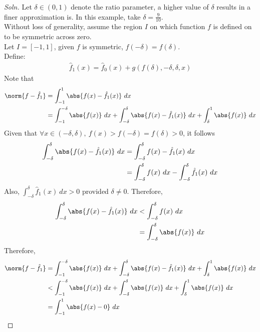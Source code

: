 \documentclass{article}
\begin{document}
	\subsubsection{}
	\begin{proof}[Soln]
		Let $\delta \in (0, 1)$ denote the ratio parameter, a higher value of $\delta$ results in a finer approximation is. In this example, take $\delta = \frac{9}{10}$. \\
		Without loss of generality, assume the region $I$ on which function $f$ is defined on to be symmetric across zero. \\
		Let $I = [-1, 1]$, given $f$ is symmetric, $f(-\delta) = f(\delta)$. \\
		Define:
		\begin{align}
			\hat{f}_1(x) = \hat{f}_0(x) + g(
				f(\delta), -\delta, \delta, x
			)
		\end{align}
		Note that
		\begin{align}
			\norm{f - \hat{f}_1}
			&= \int_{-1}^1 \abs{f(x) - \hat{f}_1(x)}\ dx \\
			&= \int_{-1}^{-\delta} \abs{f(x)}\ dx
			+ \int_{-\delta}^\delta \abs{f(x) - \hat{f}_1(x)}\ dx
			+ \int_{\delta}^{1} \abs{f(x)}\ dx
		\end{align}
		Given that $\forall x \in (-\delta, \delta),\ f(x) > f(-\delta) = f(\delta) > 0$, it follows
		\begin{align}
			\int_{-\delta}^\delta \abs{f(x) - \hat{f}_1(x)}\ dx
			&= \int_{-\delta}^\delta f(x) - \hat{f}_1(x)\ dx \\
			&= \int_{-\delta}^\delta f(x)\ dx - \int_{-\delta}^\delta \hat{f}_1(x)\ dx
		\end{align}
		Also, $\int_{-\delta}^\delta \hat{f}_1(x)\ dx > 0$ provided $\delta \neq 0$. Therefore,
		\begin{align}
			\int_{-\delta}^\delta \abs{f(x) - \hat{f}_1(x)}\ dx &< \int_{-\delta}^\delta f(x)\ dx \\
			&= \int_{-\delta}^\delta \abs{f(x)}\ dx
		\end{align}
		Therefore,
		\begin{align}
			\norm{f - \hat{f}_1} &= \int_{-1}^{-\delta} \abs{f(x)}\ dx
			+ \int_{-\delta}^\delta \abs{f(x) - \hat{f}_1(x)}\ dx
			+ \int_{\delta}^{1} \abs{f(x)}\ dx \\
			&< \int_{-1}^{-\delta} \abs{f(x)}\ dx
			+ \int_{-\delta}^\delta \abs{f(x)}\ dx
			+ \int_{\delta}^{1} \abs{f(x)}\ dx \\
			&= \int_{-1}^1 \abs{f(x) - 0}\ dx \\

\end{align}
\end{proof}
\end{document}

